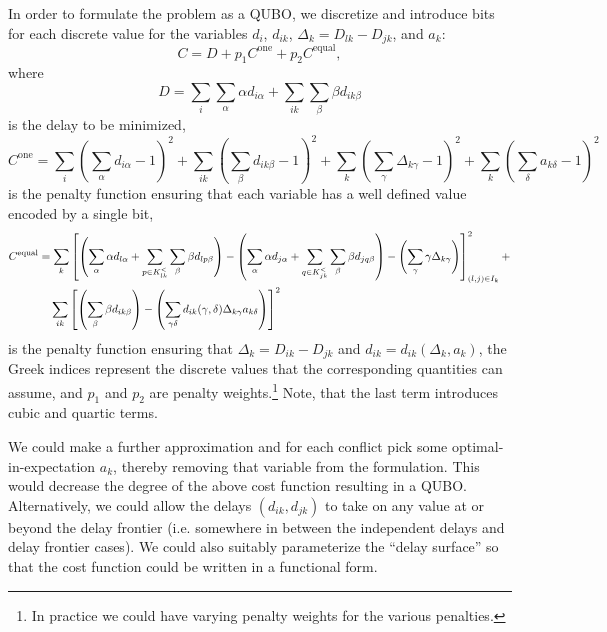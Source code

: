 \documentclass{article}
\begin{document}
In order to formulate the problem as a QUBO, we discretize and introduce bits for each discrete value for the variables $d_i$, $d_{ik}$, $\Delta_k = D_{lk} - D_{jk}$, and $a_k$:
\begin{equation*}
    C = D + p_1 C^{\mathrm{one}} + p_2 C^{\mathrm{equal}},
\end{equation*}
where 
\begin{equation*}
D = 
\sum_{i} \sum_{\alpha} \alpha d_{i\alpha}
+
\sum_{ik} \sum_{\beta} \beta d_{ik\beta}
\end{equation*}
is the delay to be minimized,
\begin{equation*}
C^{\mathrm{one}}
=
\sum_i \left(\sum_{\alpha} d_{i\alpha}- 1 \right)^2 
+
\sum_{ik} \left(\sum_{\beta} d_{ik\beta} - 1\right)^2
+
\sum_{k} \left(\sum_{\gamma} \Delta_{k\gamma} - 1\right)^2
+
\sum_{k} \left(\sum_{\delta} a_{k\delta}- 1\right)^2
\end{equation*}
is the penalty function ensuring that each variable has a well defined value encoded by a single bit,
\begin{align*}
C^{\mathrm{equal}}
&=
\sum_{k} \left[
\left(\sum_{\alpha} \alpha d_{l\alpha} + \sum_{p \in K^<_{lk}} \sum_{\beta} \beta d_{lp\beta}\right)
-
\left(\sum_{\alpha} \alpha d_{j\alpha} + \sum_{q \in K^<_{jk}} \sum_{\beta} \beta d_{jq\beta}\right)
-
\left(\sum_{\gamma} \gamma \Delta_{k\gamma}\right)\right]_{(l, j) \in I_k }^2
+ \\
&\hphantom{=,}
\sum_{ik} \left[
    \left(\sum_{\beta} \beta d_{ik\beta}\right) - 
\left(\sum_{\gamma \delta} d_{ik} (\gamma, \delta) \Delta_{k\gamma} a_{k\delta}\right)\right]^2
\end{align*}
is the penalty function ensuring that $\Delta_k = D_{ik} - D_{jk}$ and $d_{ik} = d_{ik}(\Delta_k, a_k)$, 
the Greek indices represent the discrete values that the corresponding quantities can assume, and $p_1$ and $p_2$ are penalty weights.\footnote{In practice we could have varying penalty weights for the various penalties.}
Note, that the last term introduces cubic and quartic terms.

We could make a further approximation and for each conflict pick some optimal-in-expectation $a_k$, thereby removing that variable from the formulation.
This would decrease the degree of the above cost function resulting in a QUBO.
Alternatively, we could allow the delays $(d_{ik}, d_{jk})$ to take on any value at or beyond the delay frontier (i.e. somewhere in between the independent delays and delay frontier cases).
We could also suitably parameterize the ``delay surface'' so that the cost function could be written in a functional form.
\end{document}
